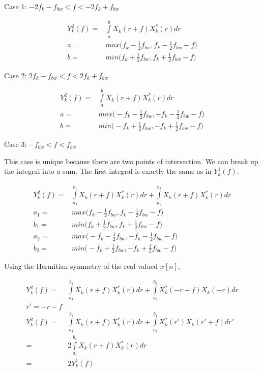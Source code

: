 \documentclass [11pt, proquest] {uwthesis}[2015/03/03]
\begin{document}
Case 1: $-2f_k - f_{bw} < f < -2f_k + f_{bw}$

\begin{align}
Y_{k}^2(f) =& \int\limits_{a}^{b} X_{k}(r + f) X_{k}^*(r)dr \\
a =& max\Big( f_k - \frac{1}{2} f_{bw},  f_k - \frac{1}{2} f_{bw} - f\Big) \\
b =& min\Big( f_k + \frac{1}{2} f_{bw},  f_k + \frac{1}{2} f_{bw} - f\Big)
\end{align}

Case 2: $2f_k - f_{bw} < f < 2f_k + f_{bw}$

\begin{align}
Y_{k}^2(f) =& \int\limits_{a}^{b} X_{k}(r + f) X_{k}^*(r)dr \\
a =& max\Big( -f_k - \frac{1}{2} f_{bw},  -f_k - \frac{1}{2} f_{bw} - f\Big) \\
b =& min\Big( -f_k + \frac{1}{2} f_{bw},  -f_k + \frac{1}{2} f_{bw} - f\Big)
\end{align}

Case 3: $- f_{bw} < f < f_{bw}$

This case is unique because there are two points of intersection.  We can break up the integral into a sum.  The first integral is exactly the same as in $Y^1_k(f)$.

\begin{align}
Y_{k}^2(f) =& \int\limits_{a_1}^{b_1} X_{k}(r + f) X_{k}^*(r)dr + \int\limits_{a_2}^{b_2} X_{k}(r + f) X_{k}^*(r)dr \\
a_1 =& max\Big( f_k - \frac{1}{2} f_{bw},  f_k - \frac{1}{2} f_{bw} - f\Big) \\
b_1 =& min\Big( f_k + \frac{1}{2} f_{bw},  f_k + \frac{1}{2} f_{bw} - f\Big) \\
a_2 =& max\Big( -f_k - \frac{1}{2} f_{bw},  -f_k - \frac{1}{2} f_{bw} - f\Big) \\
b_2 =& min\Big( -f_k + \frac{1}{2} f_{bw},  -f_k + \frac{1}{2} f_{bw} - f\Big)
\end{align}

Using the Hermitian symmetry of the real-valued $x[n]$,

\begin{align}
Y_{k}^2(f) =& \int\limits_{a_1}^{b_1} X_{k}(r + f) X_{k}^*(r)dr + \int\limits_{a_2}^{b_2} X_{k}^*(-r - f) X_{k}(-r)dr \\
r' = -r - f \nonumber \\
Y_{k}^2(f) =& \int\limits_{a_1}^{b_1} X_{k}(r + f) X_{k}^*(r)dr + \int\limits_{a_1}^{b_1} X_{k}^*(r') X_{k}(r' + f)dr' \\
=& 2 \int\limits_{a_1}^{b_1} X_{k}(r + f) X_{k}^*(r)dr \\
=& 2 Y_k^1(f)
\end{align}
\end{document}

